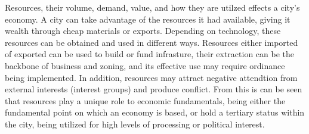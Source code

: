Resources, their volume, demand, value, and how they are utilzed  effects a city's economy. A city can take advantage of the resources it had available, giving it wealth through cheap materials or exports. Depending on technology, these resources can be obtained and used in different ways. Resources either imported of exported can be used to build or fund infrasture, their extraction can be the backbone of business and zoning, and its effective use may require ordinance being implemented. In addition, resources may attract negative attendtion from external interests (interest groups) and produce conflict. From this is can be seen that resources play a unique role to economic fundamentals, being either the fundamental point on which an economy is based, or hold a tertiary status within the city, being utilized for high levels of processing or political interest.



